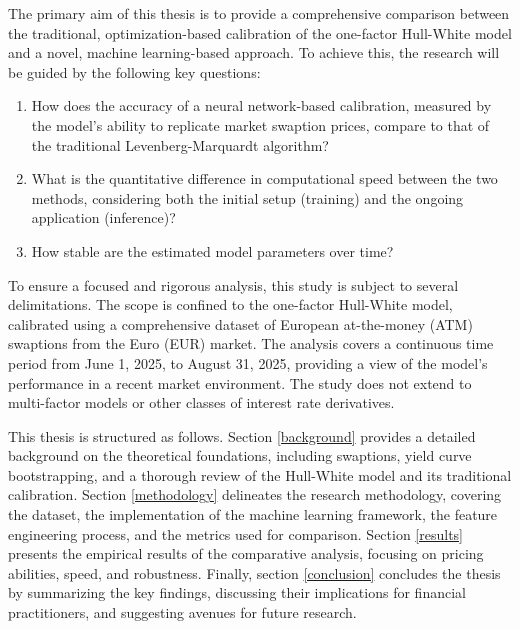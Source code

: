 The primary aim of this thesis is to provide a comprehensive comparison between the traditional, optimization-based calibration of the one-factor Hull-White model and a novel, machine learning-based approach. To achieve this, the research will be guided by the following key questions:
\begin{enumerate}
	\item How does the accuracy of a neural network-based calibration, measured by the model's ability to replicate market swaption prices, compare to that of the traditional Levenberg-Marquardt algorithm?
	\item What is the quantitative difference in computational speed between the two methods, considering both the initial setup (training) and the ongoing application (inference)?
	\item How stable are the estimated model parameters over time?
\end{enumerate}

To ensure a focused and rigorous analysis, this study is subject to several delimitations. The scope is confined to the one-factor Hull-White model, calibrated using a comprehensive dataset of European at-the-money (ATM) swaptions from the Euro (EUR) market. The analysis covers a continuous time period from June 1, 2025, to August 31, 2025, providing a view of the model's performance in a recent market environment. The study does not extend to multi-factor models or other classes of interest rate derivatives.

This thesis is structured as follows. Section \ref{background} provides a detailed background on the theoretical foundations, including swaptions, yield curve bootstrapping, and a thorough review of the Hull-White model and its traditional calibration. Section \ref{methodology} delineates the research methodology, covering the dataset, the implementation of the machine learning framework, the feature engineering process, and the metrics used for comparison. Section \ref{results} presents the empirical results of the comparative analysis, focusing on pricing abilities, speed, and robustness. Finally, section \ref{conclusion} concludes the thesis by summarizing the key findings, discussing their implications for financial practitioners, and suggesting avenues for future research.